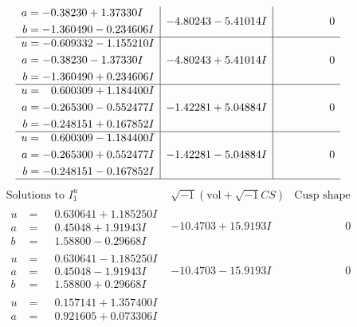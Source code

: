 \documentclass[1p]{elsarticle_modified}
\theoremstyle{definition}
\newcommand{\I}{\sqrt{-1}}
\begin{document}
$$\begin{array}{c|c|c}
\begin{aligned}
a &= -0.38230 + 1.37330 I \\
b &= -1.360490 - 0.234606 I\end{aligned}
 & -4.80243 - 5.41014 I & \phantom{-0.000000 } 0 \\ \hline\begin{aligned}
u &= -0.609332 - 1.155210 I \\
a &= -0.38230 - 1.37330 I \\
b &= -1.360490 + 0.234606 I\end{aligned}
 & -4.80243 + 5.41014 I & \phantom{-0.000000 } 0 \\ \hline\begin{aligned}
u &= \phantom{-}0.600309 + 1.184400 I \\
a &= -0.265300 - 0.552477 I \\
b &= -0.248151 + 0.167852 I\end{aligned}
 & -1.42281 + 5.04884 I & \phantom{-0.000000 } 0 \\ \hline\begin{aligned}
u &= \phantom{-}0.600309 - 1.184400 I \\
a &= -0.265300 + 0.552477 I \\
b &= -0.248151 - 0.167852 I\end{aligned}
 & -1.42281 - 5.04884 I & \phantom{-0.000000 } 0\\
 \hline 
 \end{array}$$\newpage$$\begin{array}{c|c|c}  
\text{Solutions to }I^u_{1}& \I (\text{vol} + \sqrt{-1}CS) & \text{Cusp shape}\\
 \hline 
\begin{aligned}
u &= \phantom{-}0.630641 + 1.185250 I \\
a &= \phantom{-}0.45048 + 1.91943 I \\
b &= \phantom{-}1.58800 - 0.29668 I\end{aligned}
 & -10.4703 + 15.9193 I & \phantom{-0.000000 } 0 \\ \hline\begin{aligned}
u &= \phantom{-}0.630641 - 1.185250 I \\
a &= \phantom{-}0.45048 - 1.91943 I \\
b &= \phantom{-}1.58800 + 0.29668 I\end{aligned}
 & -10.4703 - 15.9193 I & \phantom{-0.000000 } 0 \\ \hline\begin{aligned}
u &= \phantom{-}0.157141 + 1.357400 I \\
a &= \phantom{-}0.921605 + 0.073306 I \\

\end{aligned}
\end{array}$$
\end{document}
